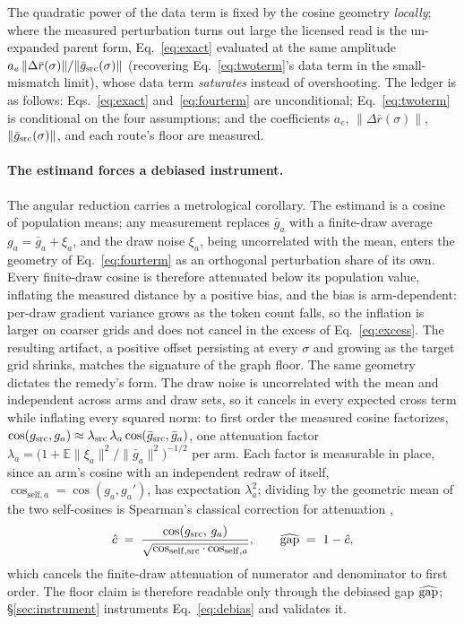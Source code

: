 The quadratic
power of the data term is fixed by the cosine geometry \emph{locally};
where the measured perturbation turns out large the licensed read is the
un-expanded parent form, Eq.~\ref{eq:exact} evaluated at the same
amplitude $a_e\,\|\Delta \bar r(\sigma)\|/\|\bar g_{\mathrm{src}}(\sigma)\|$
(recovering Eq.~\ref{eq:twoterm}'s data term in the small-mismatch
limit), whose data term
\emph{saturates} instead of overshooting.
The ledger is as follows: Eqs.~\ref{eq:exact} and~\ref{eq:fourterm}
are unconditional; Eq.~\ref{eq:twoterm} is conditional on the four
assumptions; and the coefficients $a_e$, $\|\Delta \bar r(\sigma)\|$,
$\|\bar g_{\mathrm{src}}(\sigma)\|$, and each route's floor are measured.

\paragraph{The estimand forces a debiased instrument.}
The angular reduction carries a metrological corollary. The estimand
is a cosine of population means; any measurement replaces $\bar g_a$
with a finite-draw average $g_a = \bar g_a + \xi_a$, and the draw noise
$\xi_a$, being uncorrelated with the mean, enters the geometry of
Eq.~\ref{eq:fourterm} as an orthogonal perturbation share of its own.
Every finite-draw cosine is therefore attenuated below its population
value, inflating the measured distance by a positive bias, and the
bias is arm-dependent: per-draw gradient variance grows as the token
count falls, so the inflation is larger on coarser grids and does not
cancel in the excess of Eq.~\ref{eq:excess}. The resulting artifact,
a positive offset persisting at every $\sigma$ and growing as the
target grid shrinks, matches the signature of the graph floor.
The same geometry dictates the remedy's form. The draw noise is
uncorrelated with the mean and independent across arms and draw sets,
so it cancels in every expected cross term while inflating every
squared norm: to first order the measured cosine factorizes,
$\cos(g_{\mathrm{src}}, g_a) \approx \lambda_{\mathrm{src}}\,\lambda_a
\cos(\bar g_{\mathrm{src}}, \bar g_a)$, one attenuation factor
$\lambda_a = \big(1 + \mathbb{E}\|\xi_a\|^2 /
\|\bar g_a\|^2\big)^{-1/2}$ per arm. Each factor is measurable in
place, since an arm's cosine with an independent redraw of itself,
$\cos_{\mathrm{self},a} = \cos(g_a, g_a')$, has expectation
$\lambda_a^2$; dividing by the geometric mean of the two self-cosines
is Spearman's classical correction for attenuation
\citep{spearman1904},
\begin{equation}
\hat c \;=\; \frac{\cos(g_{\mathrm{src}},\, g_{a})}
{\sqrt{\cos_{\mathrm{self},\mathrm{src}} \cdot \cos_{\mathrm{self},a}}},
\qquad
\widehat{\mathrm{gap}} \;=\; 1 - \hat c,
\label{eq:debias}
\end{equation}
which cancels the finite-draw attenuation of numerator and
denominator to first order. The floor claim is therefore readable
only through the debiased gap $\widehat{\mathrm{gap}}$;
\S\ref{sec:instrument} instruments Eq.~\ref{eq:debias} and validates
it.
